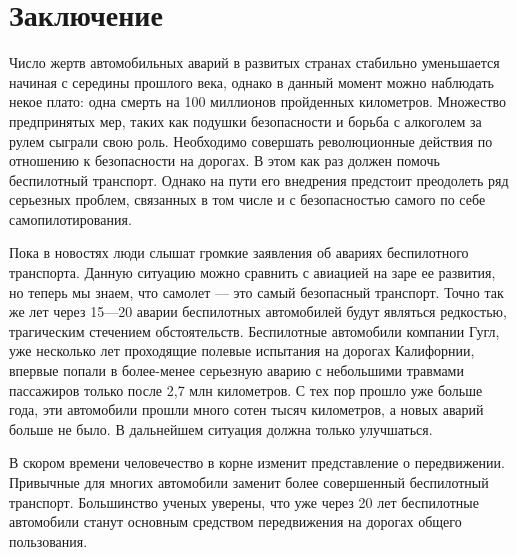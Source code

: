\chapter*{Заключение}						%

Число жертв автомобильных аварий в развитых странах стабильно уменьшается 
начиная с середины прошлого века, однако в данный момент можно наблюдать
некое плато: одна смерть на 100 
миллионов пройденных километров. Множество предпринятых мер, таких как подушки
безопасности и борьба с алкоголем за рулем сыграли свою роль. Необходимо 
совершать революционные действия по отношению к безопасности на дорогах.
В этом как раз должен помочь беспилотный транспорт. Однако на пути его 
внедрения предстоит преодолеть ряд серьезных проблем, связанных в том числе и
с безопасностью самого по себе самопилотирования.

Пока в новостях люди слышат громкие заявления об авариях беспилотного транспорта.
Данную ситуацию можно сравнить с авиацией на заре 
ее развития, но теперь мы знаем, что самолет — это самый безопасный транспорт. 
Точно так же лет через 15—20 аварии беспилотных автомобилей будут являться
редкостью, трагическим стечением обстоятельств.
Беспилотные автомобили компании Гугл, уже 
несколько лет проходящие полевые испытания на дорогах Калифорнии, впервые попали 
в более-менее серьезную аварию с небольшими травмами пассажиров только после 2,7 
млн километров. С тех пор прошло уже больше года, эти автомобили прошли 
много сотен тысяч километров, а новых аварий больше не было. В дальнейшем
ситуация должна только улучшаться.

В скором времени человечество в корне изменит представление о передвижении.
Привычные для многих автомобили заменит более совершенный беспилотный транспорт. 
Большинство ученых уверены, что уже через 20 лет беспилотные автомобили
станут основным средством передвижения на дорогах общего пользования.
